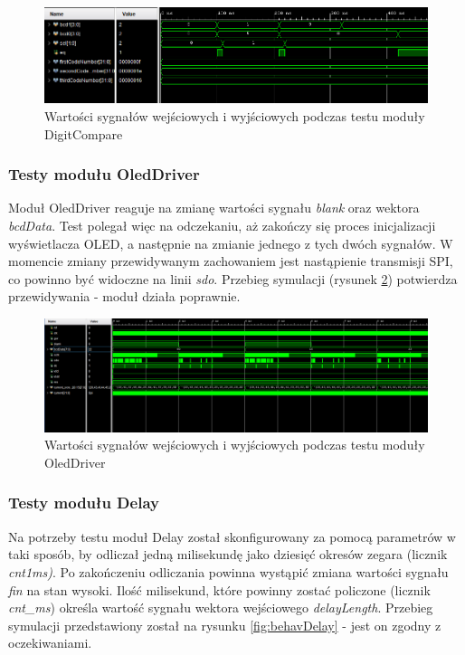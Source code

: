 \documentclass[12pt] {article}
\begin{document}
\begin{figure}[H]
\centering
\includegraphics[width=\textwidth]{res/behav_sims/DigitCompare_behavSim_1.png}
\caption{Wartości sygnałów wejściowych i wyjściowych podczas testu moduły DigitCompare}
\label{fig:behavDigitCompare}
\end{figure}

\subsubsection{Testy modułu OledDriver}
Moduł OledDriver reaguje na zmianę wartości sygnału \textit{blank} oraz wektora \textit{bcdData}. Test polegał więc na odczekaniu, aż zakończy się proces inicjalizacji wyświetlacza OLED, a następnie na zmianie jednego z tych dwóch sygnałów. W momencie zmiany przewidywanym zachowaniem jest nastąpienie transmisji SPI, co powinno być widoczne na linii \textit{sdo}. Przebieg symulacji (rysunek \ref{fig:behavOledDriver}) potwierdza przewidywania - moduł działa poprawnie.

\begin{figure}[H]
\centering
\includegraphics[width=\textwidth]{res/behav_sims/OledDriver_behavSim_1.png}
\caption{Wartości sygnałów wejściowych i wyjściowych podczas testu moduły OledDriver}
\label{fig:behavOledDriver}
\end{figure}


\subsubsection{Testy modułu Delay}
Na potrzeby testu moduł Delay został skonfigurowany za pomocą parametrów w taki sposób, by odliczał jedną milisekundę jako dziesięć okresów zegara (licznik \textit{cnt1ms)}. Po zakończeniu odliczania powinna wystąpić zmiana wartości sygnału \textit{fin} na stan wysoki. Ilość milisekund, które powinny zostać policzone (licznik \textit{cnt\_ms}) określa wartość sygnału wektora wejściowego \textit{delayLength}. Przebieg symulacji przedstawiony został na rysunku \ref{fig:behavDelay} - jest on zgodny z oczekiwaniami.
\end{document}
